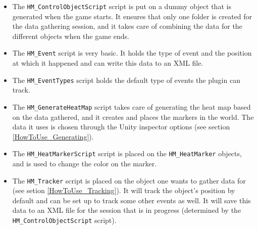 \begin{itemize}

        \item The \texttt{HM\_ControlObjectScript} script is put on a dummy object that is generated when the game starts. It ensures that only one folder is created for the data gathering session, and it takes care of combining the data for the different objects when the game ends.

        \item The \texttt{HM\_Event} script is very basic. It holds the type of event and the position at which it happened and can write this data to an XML file.

        \item The \texttt{HM\_EventTypes} script holds the default type of events the plugin can track.

        \item The \texttt{HM\_GenerateHeatMap} script takes care of generating the heat map based on the data gathered, and it creates and places the markers in the world. The data it uses is chosen through the Unity inspector options (see section \ref{HowToUse_Generating}).

        \item The \texttt{HM\_HeatMarkerScript} script is placed on the \texttt{HM\_HeatMarker} objects, and is used to change the color on the marker.

        \item The \texttt{HM\_Tracker} script is placed on the object one wants to gather data for (see setion \ref{HowToUse_Tracking}). It will track the object's position by default and can be set up to track some other events as well. It will save this data to an XML file for the session that is in progress (determined by the \texttt{HM\_ControlObjectScript} script).

\end{itemize}